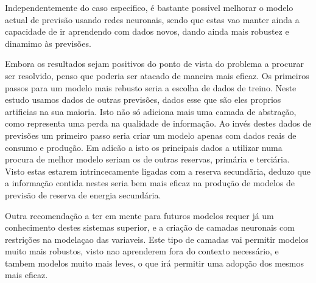 Independentemente do caso especifico, é bastante possivel melhorar o modelo actual de previsão usando redes neuronais, sendo que estas vao manter ainda a capacidade de ir aprendendo com dados novos, dando ainda mais robustez e dinamimo às previsões.


Embora os resultados sejam positivos do ponto de vista do problema a procurar ser resolvido, penso que poderia ser atacado de maneira mais eficaz.
Os primeiros passos para um modelo mais rebusto seria a escolha de dados de treino. Neste estudo usamos dados de outras previsões, dados esse que são eles proprios artificias na sua maioria. Isto não só adiciona mais uma camada de abstração, como representa uma perda na qualidade de informação.
Ao invés destes dados de previsões um primeiro passo seria criar um modelo apenas com dados reais de consumo e produção.
Em adicão a isto os principais dados a utilizar numa procura de melhor modelo seriam os de outras reservas, primária e terciária. Visto estas estarem intrincecamente ligadas com a reserva secundãria, deduzo que a informação contida nestes seria bem mais eficaz na produção de modelos de previsão de reserva de energia secundária.

Outra recomendação a ter em mente para futuros modelos requer já um conhecimento destes sistemas superior, e a criação de camadas neuronais com restrições na modelaçao das variaveis. Este tipo de camadas vai permitir modelos muito mais robustos, visto nao aprenderem fora do contexto necessário, e tambem modelos muito mais leves, o que irá permitir uma adopção dos mesmos mais eficaz.
